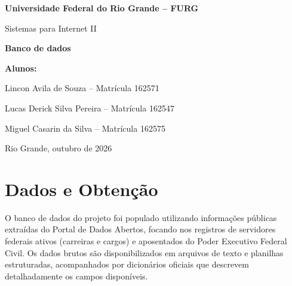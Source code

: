 \documentclass[12pt,a4paper]{article}
\newcommand{\universidade}{Universidade Federal do Rio Grande -- FURG}
\newcommand{\disciplina}{Sistemas para Internet II}
\newcommand{\titulo}{Banco de dados}
\newcommand{\cidade}{Rio Grande}
\newcommand{\datacapa}{outubro de 2026}   %
\begin{document}
\begin{titlepage}
  \centering
  {\Large \textbf{\universidade}\par}
  \vspace{1cm}
  {\large \disciplina\par}
  \vspace{3cm}
  {\LARGE \textbf{\titulo}\par}
  \vspace{3cm}
  {\large \textbf{Alunos:}\par}
  \vspace{0.4cm}
  {\large
    Lincon Avila de Souza -- Matrícula 162571\par
    Lucas Derick Silva Pereira -- Matrícula 162547\par
    Miguel Casarin da Silva -- Matrícula 162575\par}
  \vfill
  {\large \cidade, \datacapa\par}
\end{titlepage}


\section{Dados e Obtenção}

O banco de dados do projeto foi populado utilizando informações públicas extraídas do Portal de Dados Abertos, focando nos registros de servidores federais ativos (carreiras e cargos) e aposentados do Poder Executivo Federal Civil. Os dados brutos são disponibilizados em arquivos de texto e planilhas estruturadas, acompanhados por dicionários oficiais que descrevem detalhadamente os campos disponíveis.
\end{document}
